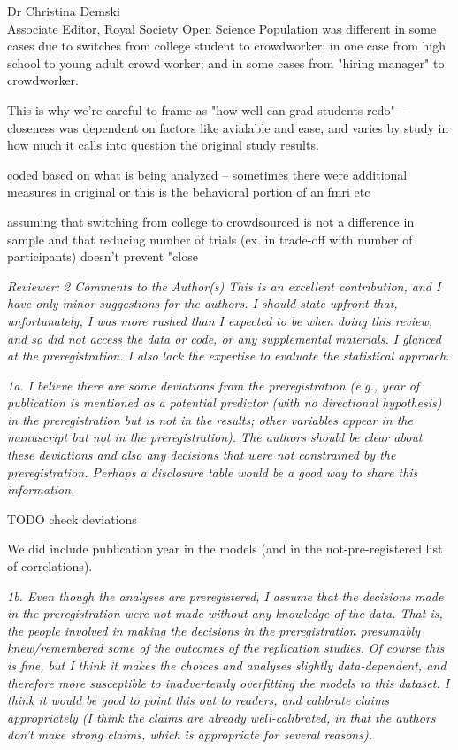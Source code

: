 \documentclass{stanfordletter}
\newcommand{\theysaid}[1]{\begin{leftbar} \noindent 
		\textsl{ #1}\end{leftbar}}
\begin{document}
\begin{letter}{Dr Christina Demski \\ Associate Editor, Royal Society Open Science}
          Population was different in some cases due to switches from college student to crowdworker; in one case from high school to young adult crowd worker; and in some cases from "hiring manager" to crowdworker. 
          
          
          This is why we're careful to frame as "how well can grad students redo" -- closeness was dependent on factors like avialable and ease, and varies by study in how much it calls into question the original study results. 
          
          coded based on what is being analyzed -- sometimes there were additional measures in original or this is the behavioral portion of an fmri etc
          
          assuming that switching from college to crowdsourced is not a difference in sample 
          and that reducing number of trials (ex. in trade-off with number of participants) doesn't prevent "close
          
          \theysaid{Reviewer: 2
          	Comments to the Author(s)
          	This is an excellent contribution, and I have only minor suggestions for the authors. I should state upfront that, unfortunately, I was more rushed than I expected to be when doing this review, and so did not access the data or code, or any supplemental materials.  I glanced at the preregistration.  I also lack the expertise to evaluate the statistical approach.
          }
          	
          \theysaid{	1a. I believe there are some deviations from the preregistration (e.g., year of publication is mentioned as a potential predictor (with no directional hypothesis) in the preregistration but is not in the results; other variables appear in the manuscript but not in the preregistration). The authors should be clear about these deviations and also any decisions that were not constrained by the preregistration. Perhaps a disclosure table would be a good way to share this information.}
          
          TODO check deviations
          
          We did include publication year in the models (and in the not-pre-registered list of correlations). 
          
          
          \theysaid{
          	1b. Even though the analyses are preregistered, I assume that the decisions made in the preregistration were not made without any knowledge of the data.  That is, the people involved in making the decisions in the preregistration presumably knew/remembered some of the outcomes of the replication studies.  Of course this is fine, but I think it makes the choices and analyses slightly data-dependent, and therefore more susceptible to inadvertently overfitting the models to this dataset. I think it would be good to point this out to readers, and calibrate claims appropriately (I think the claims are already well-calibrated, in that the authors don't make strong claims, which is appropriate for several reasons).
          }
          

\end{letter}
\end{document}
